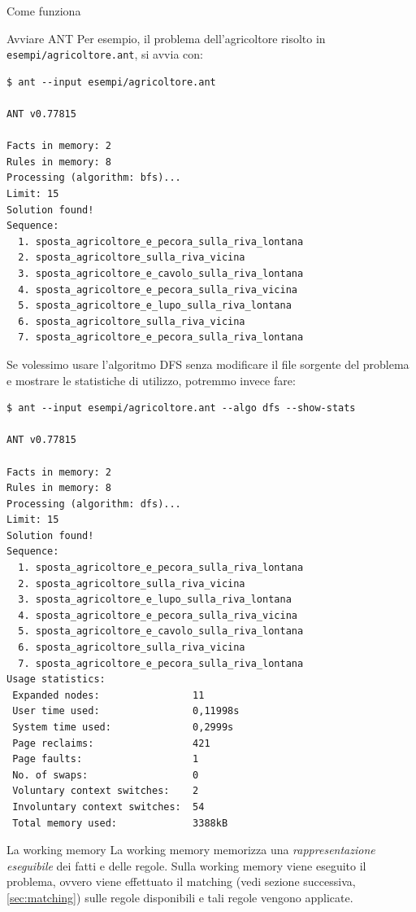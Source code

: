 \begin{chapter}{Come funziona}
\begin{section}{Avviare ANT}
Per esempio, il problema dell'agricoltore risolto in \verb,esempi/agricoltore.ant,, si avvia con:

\begin{verbatim}
$ ant --input esempi/agricoltore.ant

ANT v0.77815

Facts in memory: 2
Rules in memory: 8
Processing (algorithm: bfs)...
Limit: 15
Solution found!
Sequence: 
  1. sposta_agricoltore_e_pecora_sulla_riva_lontana
  2. sposta_agricoltore_sulla_riva_vicina
  3. sposta_agricoltore_e_cavolo_sulla_riva_lontana
  4. sposta_agricoltore_e_pecora_sulla_riva_vicina
  5. sposta_agricoltore_e_lupo_sulla_riva_lontana
  6. sposta_agricoltore_sulla_riva_vicina
  7. sposta_agricoltore_e_pecora_sulla_riva_lontana
\end{verbatim}

Se volessimo usare l'algoritmo DFS senza modificare il file sorgente del problema e mostrare le
statistiche di utilizzo, potremmo invece fare:

\begin{verbatim}
$ ant --input esempi/agricoltore.ant --algo dfs --show-stats

ANT v0.77815

Facts in memory: 2
Rules in memory: 8
Processing (algorithm: dfs)...
Limit: 15
Solution found!
Sequence: 
  1. sposta_agricoltore_e_pecora_sulla_riva_lontana
  2. sposta_agricoltore_sulla_riva_vicina
  3. sposta_agricoltore_e_lupo_sulla_riva_lontana
  4. sposta_agricoltore_e_pecora_sulla_riva_vicina
  5. sposta_agricoltore_e_cavolo_sulla_riva_lontana
  6. sposta_agricoltore_sulla_riva_vicina
  7. sposta_agricoltore_e_pecora_sulla_riva_lontana
Usage statistics:
 Expanded nodes:                11
 User time used:                0,11998s
 System time used:              0,2999s
 Page reclaims:                 421
 Page faults:                   1
 No. of swaps:                  0
 Voluntary context switches:    2
 Involuntary context switches:  54
 Total memory used:             3388kB
\end{verbatim}
\end{section}

\begin{section}{La working memory}
\label{sec:workingmemory-overview}
La working memory memorizza una \textit{rappresentazione eseguibile} dei fatti e
delle regole. Sulla working memory viene eseguito il problema, ovvero viene effettuato
il matching (vedi sezione successiva, \ref{sec:matching}) sulle regole disponibili
e tali regole vengono applicate.
\end{section}


\end{chapter}
